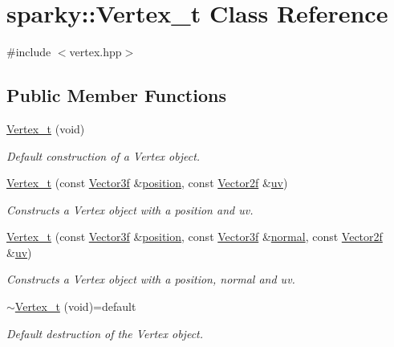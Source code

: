 \hypertarget{structsparky_1_1_vertex__t}{}\section{sparky\+:\+:Vertex\+\_\+t Class Reference}
\label{structsparky_1_1_vertex__t}


{\ttfamily \#include $<$vertex.\+hpp$>$}

\subsection*{Public Member Functions}
\begin{DoxyCompactItemize}
\item 
\hyperlink{structsparky_1_1_vertex__t_a4cc59f5fc588c4b6c3cf8c3498a1da35}{Vertex\+\_\+t} (void)
\begin{DoxyCompactList}\small\item\em Default construction of a Vertex object. \end{DoxyCompactList}\item 
\hyperlink{structsparky_1_1_vertex__t_a42777014ce4a20bb67f7debee7f78367}{Vertex\+\_\+t} (const \hyperlink{classsparky_1_1_vector3}{Vector3f} \&\hyperlink{structsparky_1_1_vertex__t_a451b5dfe28e6142cded4d61732f1bab5}{position}, const \hyperlink{classsparky_1_1_vector2}{Vector2f} \&\hyperlink{structsparky_1_1_vertex__t_a7e97e56f9ec466f059da0887e87305c9}{uv})
\begin{DoxyCompactList}\small\item\em Constructs a Vertex object with a position and uv. \end{DoxyCompactList}\item 
\hyperlink{structsparky_1_1_vertex__t_ab50d1fd26b9141f36e7dc934a8c03845}{Vertex\+\_\+t} (const \hyperlink{classsparky_1_1_vector3}{Vector3f} \&\hyperlink{structsparky_1_1_vertex__t_a451b5dfe28e6142cded4d61732f1bab5}{position}, const \hyperlink{classsparky_1_1_vector3}{Vector3f} \&\hyperlink{structsparky_1_1_vertex__t_ac52963418ebdb1ce5f5b211375d90b19}{normal}, const \hyperlink{classsparky_1_1_vector2}{Vector2f} \&\hyperlink{structsparky_1_1_vertex__t_a7e97e56f9ec466f059da0887e87305c9}{uv})
\begin{DoxyCompactList}\small\item\em Constructs a Vertex object with a position, normal and uv. \end{DoxyCompactList}\item 
\hyperlink{structsparky_1_1_vertex__t_a34bf74fc8d8b59bb58c61c411e7e44c9}{$\sim$\+Vertex\+\_\+t} (void)=default\hypertarget{structsparky_1_1_vertex__t_a34bf74fc8d8b59bb58c61c411e7e44c9}{}\label{structsparky_1_1_vertex__t_a34bf74fc8d8b59bb58c61c411e7e44c9}

\begin{DoxyCompactList}\small\item\em Default destruction of the Vertex object. \end{DoxyCompactList}\end{DoxyCompactItemize}
